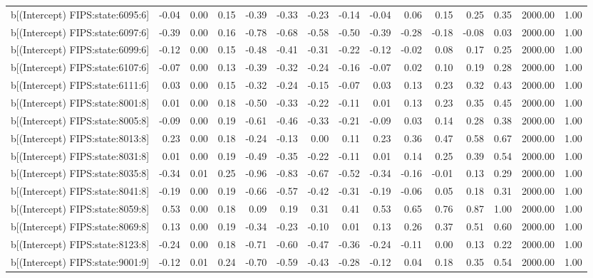 \begin{table}[ht]
\begin{tabular}{rrrrrrrrrrrrrrr}
  b[(Intercept) FIPS:state:6095:6] & -0.04 & 0.00 & 0.15 & -0.39 & -0.33 & -0.23 & -0.14 & -0.04 & 0.06 & 0.15 & 0.25 & 0.35 & 2000.00 & 1.00 \\ 
  b[(Intercept) FIPS:state:6097:6] & -0.39 & 0.00 & 0.16 & -0.78 & -0.68 & -0.58 & -0.50 & -0.39 & -0.28 & -0.18 & -0.08 & 0.03 & 2000.00 & 1.00 \\ 
  b[(Intercept) FIPS:state:6099:6] & -0.12 & 0.00 & 0.15 & -0.48 & -0.41 & -0.31 & -0.22 & -0.12 & -0.02 & 0.08 & 0.17 & 0.25 & 2000.00 & 1.00 \\ 
  b[(Intercept) FIPS:state:6107:6] & -0.07 & 0.00 & 0.13 & -0.39 & -0.32 & -0.24 & -0.16 & -0.07 & 0.02 & 0.10 & 0.19 & 0.28 & 2000.00 & 1.00 \\ 
  b[(Intercept) FIPS:state:6111:6] & 0.03 & 0.00 & 0.15 & -0.32 & -0.24 & -0.15 & -0.07 & 0.03 & 0.13 & 0.23 & 0.32 & 0.43 & 2000.00 & 1.00 \\ 
  b[(Intercept) FIPS:state:8001:8] & 0.01 & 0.00 & 0.18 & -0.50 & -0.33 & -0.22 & -0.11 & 0.01 & 0.13 & 0.23 & 0.35 & 0.45 & 2000.00 & 1.00 \\ 
  b[(Intercept) FIPS:state:8005:8] & -0.09 & 0.00 & 0.19 & -0.61 & -0.46 & -0.33 & -0.21 & -0.09 & 0.03 & 0.14 & 0.28 & 0.38 & 2000.00 & 1.00 \\ 
  b[(Intercept) FIPS:state:8013:8] & 0.23 & 0.00 & 0.18 & -0.24 & -0.13 & 0.00 & 0.11 & 0.23 & 0.36 & 0.47 & 0.58 & 0.67 & 2000.00 & 1.00 \\ 
  b[(Intercept) FIPS:state:8031:8] & 0.01 & 0.00 & 0.19 & -0.49 & -0.35 & -0.22 & -0.11 & 0.01 & 0.14 & 0.25 & 0.39 & 0.54 & 2000.00 & 1.00 \\ 
  b[(Intercept) FIPS:state:8035:8] & -0.34 & 0.01 & 0.25 & -0.96 & -0.83 & -0.67 & -0.52 & -0.34 & -0.16 & -0.01 & 0.13 & 0.29 & 2000.00 & 1.00 \\ 
  b[(Intercept) FIPS:state:8041:8] & -0.19 & 0.00 & 0.19 & -0.66 & -0.57 & -0.42 & -0.31 & -0.19 & -0.06 & 0.05 & 0.18 & 0.31 & 2000.00 & 1.00 \\ 
  b[(Intercept) FIPS:state:8059:8] & 0.53 & 0.00 & 0.18 & 0.09 & 0.19 & 0.31 & 0.41 & 0.53 & 0.65 & 0.76 & 0.87 & 1.00 & 2000.00 & 1.00 \\ 
  b[(Intercept) FIPS:state:8069:8] & 0.13 & 0.00 & 0.19 & -0.34 & -0.23 & -0.10 & 0.01 & 0.13 & 0.26 & 0.37 & 0.51 & 0.60 & 2000.00 & 1.00 \\ 
  b[(Intercept) FIPS:state:8123:8] & -0.24 & 0.00 & 0.18 & -0.71 & -0.60 & -0.47 & -0.36 & -0.24 & -0.11 & 0.00 & 0.13 & 0.22 & 2000.00 & 1.00 \\ 
  b[(Intercept) FIPS:state:9001:9] & -0.12 & 0.01 & 0.24 & -0.70 & -0.59 & -0.43 & -0.28 & -0.12 & 0.04 & 0.18 & 0.35 & 0.54 & 2000.00 & 1.00 \\ 

\end{tabular}
\end{table}
